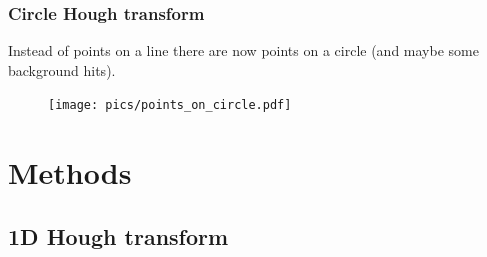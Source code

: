 \documentclass[10pt, xcolor={table}]{beamer}
\begin{document}
\begin{frame}
  \frametitle{Circle Hough transform} 
  Instead of points on a line there are now points on a circle (and maybe some background hits).
  \begin{figure}
    \texttt{[image: pics/points\_on\_circle.pdf]}
  \end{figure}
\end{frame}

\section{Methods} %
\label{sec:methods}

\subsection{1D Hough transform} %
\label{sub:1d_hough_transform}
\end{document}
